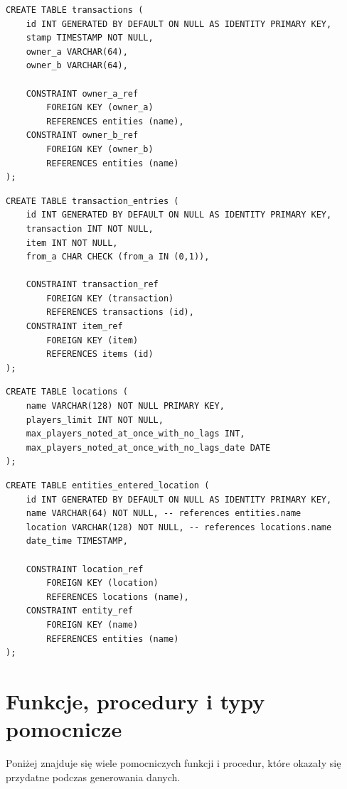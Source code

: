 \documentclass[11pt]{article}
\numberwithin{figure}{subsection}
\begin{document}
	\begin{lstlisting}[caption={Kod utworzenia tabeli transactions},captionpos=b]
CREATE TABLE transactions (
	id INT GENERATED BY DEFAULT ON NULL AS IDENTITY PRIMARY KEY,
	stamp TIMESTAMP NOT NULL,
	owner_a VARCHAR(64),
	owner_b VARCHAR(64),
	
	CONSTRAINT owner_a_ref
		FOREIGN KEY (owner_a)
		REFERENCES entities (name),
	CONSTRAINT owner_b_ref
		FOREIGN KEY (owner_b)
		REFERENCES entities (name)
);
    \end{lstlisting}

	\begin{lstlisting}[caption={Kod utworzenia tabeli transaction\_entries},captionpos=b]
CREATE TABLE transaction_entries (
	id INT GENERATED BY DEFAULT ON NULL AS IDENTITY PRIMARY KEY,
	transaction INT NOT NULL,
	item INT NOT NULL,
	from_a CHAR CHECK (from_a IN (0,1)),
	
	CONSTRAINT transaction_ref
		FOREIGN KEY (transaction)
		REFERENCES transactions (id),
	CONSTRAINT item_ref
		FOREIGN KEY (item)
		REFERENCES items (id)
);
    \end{lstlisting}

	\begin{lstlisting}[caption={Kod utworzenia tabeli locations},captionpos=b]
CREATE TABLE locations (
	name VARCHAR(128) NOT NULL PRIMARY KEY,
	players_limit INT NOT NULL,
	max_players_noted_at_once_with_no_lags INT,
	max_players_noted_at_once_with_no_lags_date DATE
);
    \end{lstlisting}

	\begin{lstlisting}[caption={Kod utworzenia tabeli entities\_entered\_location},captionpos=b]
CREATE TABLE entities_entered_location (
	id INT GENERATED BY DEFAULT ON NULL AS IDENTITY PRIMARY KEY,
	name VARCHAR(64) NOT NULL, -- references entities.name
	location VARCHAR(128) NOT NULL, -- references locations.name
	date_time TIMESTAMP,
	
	CONSTRAINT location_ref
		FOREIGN KEY (location)
		REFERENCES locations (name),
	CONSTRAINT entity_ref
		FOREIGN KEY (name)
		REFERENCES entities (name)
);
    \end{lstlisting}


	
\section{Funkcje, procedury i typy pomocnicze}
	Poniżej znajduje się wiele pomocniczych funkcji i procedur, które okazały
	się przydatne podczas generowania danych. 
	
\end{document}
